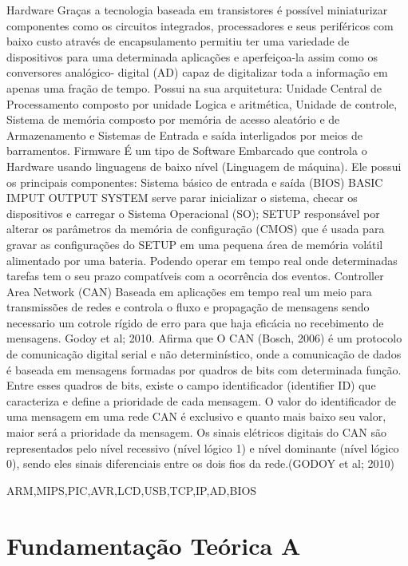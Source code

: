 Hardware 
Graças a tecnologia baseada em transistores é possível miniaturizar componentes como os circuitos integrados, processadores e seus periféricos com baixo custo através de encapsulamento permitiu ter uma variedade de dispositivos para uma determinada aplicações e aperfeiçoa-la assim como os conversores analógico- digital (AD) capaz de digitalizar toda a informação em apenas uma fração de tempo.  Possui na sua arquitetura: Unidade Central de Processamento composto por unidade Logica e aritmética, Unidade de controle, Sistema de memória composto por memória de acesso aleatório e de Armazenamento e Sistemas de Entrada e saída interligados por meios de barramentos.
Firmware
É um tipo de Software Embarcado que controla o Hardware usando linguagens de baixo nível (Linguagem de máquina). Ele possui os principais componentes: Sistema básico de entrada e saída (BIOS) BASIC IMPUT OUTPUT SYSTEM serve parar inicializar o sistema, checar os dispositivos e carregar o Sistema Operacional (SO); SETUP responsável por alterar os parâmetros da memória de configuração (CMOS) que é usada para gravar as configurações do SETUP em uma pequena área de memória volátil alimentado por uma bateria. Podendo operar em tempo real onde determinadas tarefas tem o seu prazo compatíveis com a ocorrência dos eventos.
Controller Area Network (CAN)
Baseada em aplicações em tempo real um meio para transmissões de redes e controla o fluxo e propagação de mensagens sendo necessario um cotrole rígido de erro para que haja eficácia no recebimento de mensagens.
Godoy et al; 2010. Afirma que O CAN (Bosch, 2006) é um protocolo de comunicação digital serial e não determinístico, onde a comunicação de dados é baseada em mensagens formadas por quadros de bits com determinada função. Entre esses quadros de bits, existe o campo identificador (identifier ID) que caracteriza e define a prioridade de cada mensagem. O valor do identificador de uma mensagem em uma rede CAN é exclusivo e quanto mais baixo seu valor, maior será a prioridade da mensagem. Os sinais elétricos digitais do CAN são representados pelo nível recessivo (nível lógico 1) e nível dominante (nível lógico 0), sendo eles sinais diferenciais entre os dois fios da rede.(GODOY et al; 2010)

\label{cap:fundamentacao-teorica}

\acrlong{ARM},\acrlong{MIPS},\acrlong{PIC},\acrlong{AVR},\acrlong{LCD},\acrlong{USB},\acrlong{TCP},\acrlong{IP},\acrlong{AD},\acrlong{BIOS}


\section{Fundamentação Teórica A}

